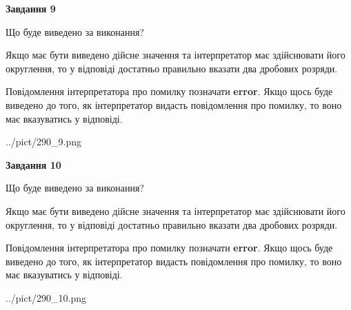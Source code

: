 \documentclass[12pt, ukrainian]{article}
\begin{document}
{\begin {Large}
{\begin {center}\textbf{Завдання 9}\end {center}}\par
Що буде виведено за виконання? \par

Якщо має бути виведено дійсне значення та інтерпретатор має здійснювати його округлення, 
то у відповіді достатньо правильно вказати два дробових розряди.

Повідомлення інтерпретатора про помилку позначати \textbf{error}.
Якщо щось буде виведено до того, як інтерпретатор видасть повідомлення про помилку, 
то воно має вказуватись у відповіді. \par

\begin{center}
	{../pict/290_9.png}
\end{center}
\newpage

{\begin {center}\textbf{Завдання 10}\end {center}}\par
Що буде виведено за виконання? \par

Якщо має бути виведено дійсне значення та інтерпретатор має здійснювати його округлення, 
то у відповіді достатньо правильно вказати два дробових розряди.

Повідомлення інтерпретатора про помилку позначати \textbf{error}.
Якщо щось буде виведено до того, як інтерпретатор видасть повідомлення про помилку, 
то воно має вказуватись у відповіді. \par

\begin{center}
	{../pict/290_10.png}
\end{center}
\newpage

\end {Large}}
\end{document}
